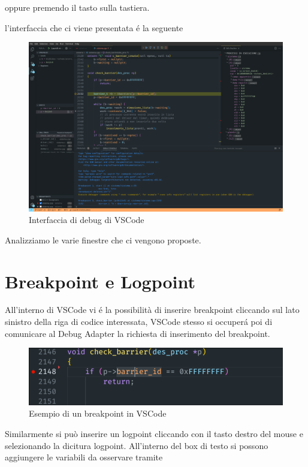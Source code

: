 oppure premendo il tasto  sulla tastiera.

l'interfaccia che ci viene presentata é la seguente 

\begin{figure}[H]
    \centering
    \includegraphics[width=\columnwidth]{images/fullDebug.png}
    \caption{Interfaccia di debug di  VSCode}
    \label{fig:debug screen}
\end{figure}

Analizziamo le varie finestre che ci vengono proposte.

\section{Breakpoint e Logpoint}
All'interno di VSCode vi é la possibilità di inserire breakpoint cliccando sul lato sinistro della riga di codice interessata, VSCode stesso si occuperá poi di comunicare al Debug Adapter la richiesta di inserimento del breakpoint.

\begin{figure}[H]
    \centering
    \includegraphics[width=0.7\columnwidth]{images/breakpoint_vscode.png}
    \caption{Esempio di un breakpoint in VSCode}
    \label{fig:breakpoint}
\end{figure}

Similarmente si può inserire un logpoint cliccando con il tasto destro del mouse e selezionando la dicitura logpoint. All'interno del box di testo si possono aggiungere le variabili da osservare tramite 

